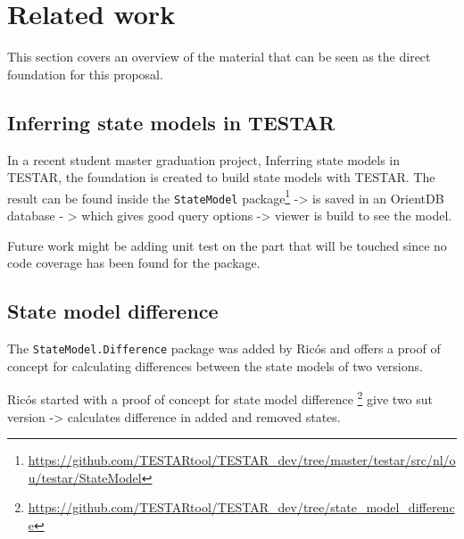 \section{Related work} \label{releatedWork}
    
    This section covers an overview of the material that can be seen as the direct foundation for this proposal.
    
    
    \subsection{Inferring state models in TESTAR}
    
        In a recent student master graduation project, Inferring state models in TESTAR, \cite{thesisMulders}  the foundation is created to build state models with TESTAR. The result can be found inside the \verb|StateModel| package\footnote{\url{https://github.com/TESTARtool/TESTAR_dev/tree/master/testar/src/nl/ou/testar/StateModel}}
        -> is saved in an OrientDB database - > which gives good query options -> viewer is build to see the model. 
        
        Future work might be adding unit test on the part that will be touched since no code coverage has been found for the package.

        
        
        


    \subsection{State model difference}
        The \verb|StateModel.Difference| package was added by Ricós\cite{stateDiff} and offers a proof of concept for calculating differences between the state models of two versions. 
        
        Ricós started with a proof of concept for state model difference \footnote{\url{https://github.com/TESTARtool/TESTAR_dev/tree/state_model_difference}}
        give two sut version -> calculates difference in added and removed states.
        
